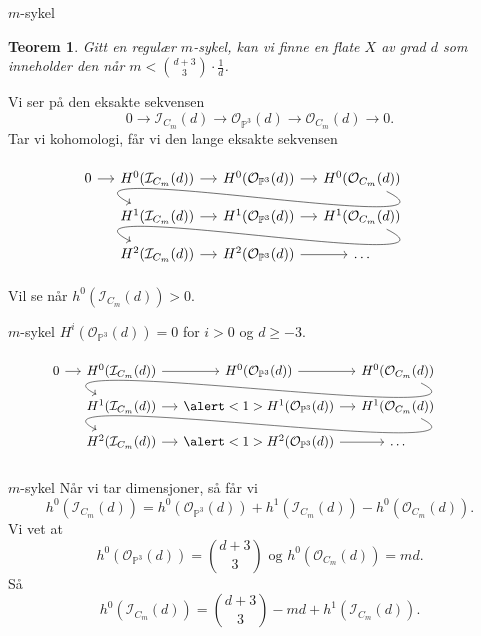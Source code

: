 \documentclass[UKenglish,aspectratio=169]{beamer}
\newtheorem{teorem}{Teorem}
\begin{document}
\begin{frame}[fragile]{$m$-sykel}
        \begin{teorem}
        Gitt en regulær $m$-sykel, kan vi finne en flate $X$ av grad $d$ som inneholder den når $m < \binom{d+3}{3}\cdot \frac{1}{d}$.
    \end{teorem}
    
    Vi ser på den eksakte sekvensen
    \[0 \to \mathcal{I}_{C_m}(d) \to \mathcal{O}_{\mathbb{P}^3}(d) \to \mathcal{O}_{C_m}(d) \to 0.\]
    Tar vi kohomologi, får vi den lange eksakte sekvensen
    \[
        \begin{tikzcd}[sep=small]
        0 \ar[r]
        & H^0(\mathcal{I}_{C_m}(d)) \ar[r]
        & H^0(\mathcal{O}_{\mathbb{P}^3}(d)) \ar[r]
        & H^0(\mathcal{O}_{C_m}(d)) \ar[controls={+(3,-1.5) and +(-3,1.5)}]{dll} \\
        {}
        & H^1(\mathcal{I}_{C_m}(d)) \ar[r]
        & H^1(\mathcal{O}_{\mathbb{P}^3}(d)) \ar[r]
        & H^1(\mathcal{O}_{C_m}(d)) \ar[controls={+(3,-1.5) and +(-3,1.5)}]{dll} \\
        {}
        & H^2(\mathcal{I}_{C_m}(d)) \ar[r]
        & H^2(\mathcal{O}_{\mathbb{P}^3}(d)) \ar[r]
        & \dots
        \end{tikzcd}
    \]
    Vil se når $h^0(\mathcal{I}_{C_m}(d)) > 0$.
\end{frame}

\begin{frame}[fragile]{$m$-sykel}
    $H^i(\mathcal{O}_{\mathbb{P}^3}(d)) = 0$ for $i > 0$ og $d \geq -3$.
    \[
        \begin{tikzcd}[sep=small]
        0 \ar[r]
        & H^0(\mathcal{I}_{C_m}(d)) \ar[r]
        & H^0(\mathcal{O}_{\mathbb{P}^3}(d)) \ar[r]
        & H^0(\mathcal{O}_{C_m}(d)) \ar[controls={+(3,-1.5) and +(-3,1.5)}]{dll} \\
        {}
        & H^1(\mathcal{I}_{C_m}(d)) \ar[r]
        & \alert<1>{H^1(\mathcal{O}_{\mathbb{P}^3}(d))} \ar[r]
        & H^1(\mathcal{O}_{C_m}(d)) \ar[controls={+(3,-1.5) and +(-3,1.5)}]{dll} \\
        {}
        & H^2(\mathcal{I}_{C_m}(d)) \ar[r]
        & \alert<1>{H^2(\mathcal{O}_{\mathbb{P}^3}(d))} \ar[r]
        & \dots
        \end{tikzcd}
    \]
\end{frame}

\begin{frame}{$m$-sykel}
    Når vi tar dimensjoner, så får vi
    \[h^0(\mathcal{I}_{C_m}(d)) = h^0(\mathcal{O}_{\mathbb{P}^3}(d)) + h^1(\mathcal{I}_{C_m}(d)) - h^0(\mathcal{O}_{C_m}(d)).\]
    Vi vet at
    \[h^0(\mathcal{O}_{\mathbb{P}^3}(d)) = \binom{d+3}{3} \text{ og } h^0(\mathcal{O}_{C_m}(d)) = md.\]
    Så
    \[h^0(\mathcal{I}_{C_m}(d)) = \binom{d+3}{3} - md + h^1(\mathcal{I}_{C_m}(d)).\]
\end{frame}
\end{document}
